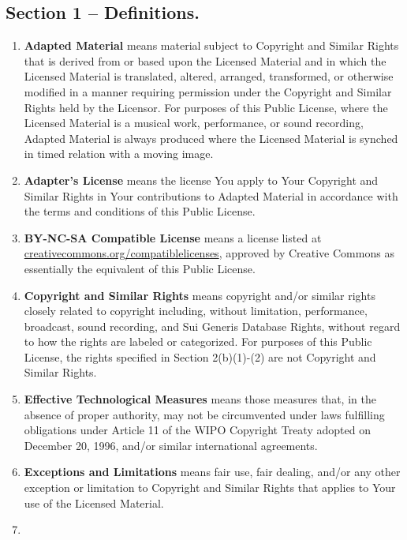 \documentclass[]{book}
\begin{document}
\hypertarget{section-1-definitions.}{%
\subsection{Section 1 -- Definitions.}\label{section-1-definitions.}}

\begin{enumerate}
\def\labelenumi{\alph{enumi}.}
\item
  \textbf{Adapted Material} means material subject to Copyright and Similar Rights that is derived from or based upon the Licensed Material and in which the Licensed Material is translated, altered, arranged, transformed, or otherwise modified in a manner requiring permission under the Copyright and Similar Rights held by the Licensor. For purposes of this Public License, where the Licensed Material is a musical work, performance, or sound recording, Adapted Material is always produced where the Licensed Material is synched in timed relation with a moving image.
\item
  \textbf{Adapter's License} means the license You apply to Your Copyright and Similar Rights in Your contributions to Adapted Material in accordance with the terms and conditions of this Public License.
\item
  \textbf{BY-NC-SA Compatible License} means a license listed at \href{http://creativecommons.org/compatiblelicenses}{creativecommons.org/compatiblelicenses}, approved by Creative Commons as essentially the equivalent of this Public License.
\item
  \textbf{Copyright and Similar Rights} means copyright and/or similar rights closely related to copyright including, without limitation, performance, broadcast, sound recording, and Sui Generis Database Rights, without regard to how the rights are labeled or categorized. For purposes of this Public License, the rights specified in Section 2(b)(1)-(2) are not Copyright and Similar Rights.
\item
  \textbf{Effective Technological Measures} means those measures that, in the absence of proper authority, may not be circumvented under laws fulfilling obligations under Article 11 of the WIPO Copyright Treaty adopted on December 20, 1996, and/or similar international agreements.
\item
  \textbf{Exceptions and Limitations} means fair use, fair dealing, and/or any other exception or limitation to Copyright and Similar Rights that applies to Your use of the Licensed Material.
\item

\end{enumerate}
\end{document}
